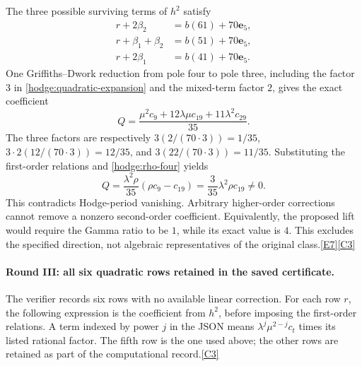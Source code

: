 \documentclass[11pt]{article}
\newcommand{\src}[1]{\hyperlink{src:#1}{[#1]}}
\begin{document}
The three possible surviving terms of $h^2$ satisfy
\begin{align*}
 r+2\beta_2&=b(61)+70\mathbf e_5,\\
 r+\beta_1+\beta_2&=b(51)+70\mathbf e_5,\\
 r+2\beta_1&=b(41)+70\mathbf e_5.
\end{align*}
One Griffiths--Dwork reduction from pole four to pole three, including the
factor $3$ in \eqref{hodge:quadratic-expansion} and the mixed-term factor
$2$, gives the exact coefficient
\begin{equation}\label{hodge:quadratic-Q}
 Q=\frac{\mu^2c_9+12\lambda\mu c_{19}+11\lambda^2c_{29}}{35}.
\end{equation}
The three factors are respectively
$3(2/(70\cdot3))=1/35$,
$3\cdot2(12/(70\cdot3))=12/35$, and
$3(22/(70\cdot3))=11/35$.
Substituting the first-order relations and \eqref{hodge:rho-four} yields
\begin{equation}\label{hodge:nonzero-quadratic}
 Q=\frac{\lambda^2\rho}{35}(\rho c_9-c_{19})
   =\frac{3}{35}\lambda^2\rho c_{19}\ne0.
\end{equation}
This contradicts Hodge-period vanishing. Arbitrary higher-order corrections
cannot remove a nonzero second-order coefficient. Equivalently, the proposed
lift would require the Gamma ratio to be $1$, while its exact value is $4$.
This excludes the specified direction, not algebraic representatives of the
original class.\src{E7}\src{C3}

\paragraph{Round III: all six quadratic rows retained in the saved certificate.}
The verifier records six rows with no available linear correction. For each
row $r$, the following expression is the coefficient from $h^2$, before
imposing the first-order relations. A term indexed by power $j$ in the JSON
means $\lambda^j\mu^{2-j}c_t$ times its listed rational factor. The fifth
row is the one used above; the other rows are retained as part of the
computational record.\src{C3}
\end{document}
